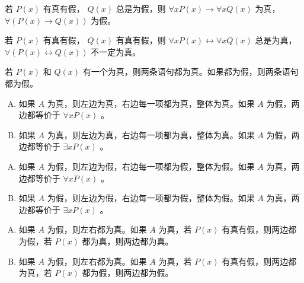 {{        %
        \begin{practices}
            若 $P(x)$ 有真有假， $Q(x)$ 总是为假，则 $\forall x P(x) \rightarrow \forall x Q(x)$ 为真， $\forall (P(x) \rightarrow Q(x))$ 为假。
        \end{practices}

        \begin{practices}
            若 $P(x)$ 有真有假， $Q(x)$ 有真有假，则 $\forall x P(x) \leftrightarrow \forall x Q(x)$ 总是为真， $\forall (P(x) \leftrightarrow Q(x))$ 不一定为真。
        \end{practices}

        \begin{practices}
            若 $P(x)$ 和 $Q(x)$ 有一个为真，则两条语句都为真。如果都为假，则两条语句都为假。
        \end{practices}

        \begin{practices}
            \begin{enumerate}[A.]
                \item 如果 $A$ 为真，则左边为真，右边每一项都为真，整体为真。如果 $A$ 为假，两边都等价于 $\forall x P(x)$ 。
                \item 如果 $A$ 为真，则左边为真，右边每一项都为真，整体为真。如果 $A$ 为假，两边都等价于 $\exists x P(x)$ 。
            \end{enumerate}
        \end{practices}

        \begin{practices}
            \begin{enumerate}[A.]
                \item 如果 $A$ 为假，则左边为假，右边每一项都为假，整体为假。如果 $A$ 为真，两边都等价于 $\forall x P(x)$ 。
                \item 如果 $A$ 为假，则左边为假，右边每一项都为假，整体为假。如果 $A$ 为真，两边都等价于 $\exists x P(x)$ 。
            \end{enumerate}
        \end{practices}

        \begin{practices}
            \begin{enumerate}[A.]
                \item 如果 $A$ 为假，则左右都为真。如果 $A$ 为真，若 $P(x)$ 有真有假，则两边都为假，若 $P(x)$ 都为真，则两边都为真。
                \item 如果 $A$ 为假，则左右都为真。如果 $A$ 为真，若 $P(x)$ 有真有假，则两边都为真，若 $P(x)$ 都为假，则两边都为假。
            \end{enumerate}
        \end{practices}

}}
